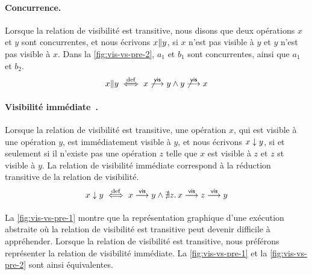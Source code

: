 \paragraph{Concurrence.}
Lorsque la relation de visibilité est transitive, nous disons que deux opérations $x$ et $y$ sont concurrentes, et nous écrivons $x \| y$, si $x$ n'est pas visible à $y$ et $y$ n'est pas visible à $x$.
Dans la \autoref{fig:vis-vs-pre-2}, $a_1$ et $b_1$ sont concurrentes, ainsi que $a_1$ et $b_2$.
%
\begin{equation*}
    x \| y \overset{\mathrm{def}}{\iff} x \not\overset{\mathsf{vis}}{\longrightarrow} y \land y \not\overset{\mathsf{vis}}{\longrightarrow} x
\end{equation*}

\paragraph{Visibilité immédiate~\autocite{hernandez2003immediate,hernandez2015minimal}.}
Lorsque la relation de visibilité est transitive, une opération $x$, qui est visible à une opération $y$, est immédiatement visible à $y$, et nous écrivons $x \downarrow y$, si et seulement si il n'existe pas une opération $z$ telle que $x$ est visible à $z$ et $z$ st visible à $y$.
La relation de visibilité immédiate correspond à la réduction transitive de la relation de visibilité.
%
\begin{equation*}
    x \downarrow y \overset{\mathrm{def}}{\iff} x \overset{\mathsf{vis}}{\longrightarrow} y \land \nexists z \ldotp x \overset{\mathsf{vis}}{\longrightarrow} z \overset{\mathsf{vis}}{\longrightarrow} y
\end{equation*}

\paragraph{} La \autoref{fig:vis-vs-pre-1} montre que la représentation graphique d'une exécution abstraite où la relation de visibilité est transitive peut devenir difficile à appréhender.
Lorsque la relation de visibilité est transitive, nous préférons représenter la relation de visibilité immédiate.
La \autoref{fig:vis-vs-pre-1} et la \autoref{fig:vis-vs-pre-2} sont ainsi équivalentes.

